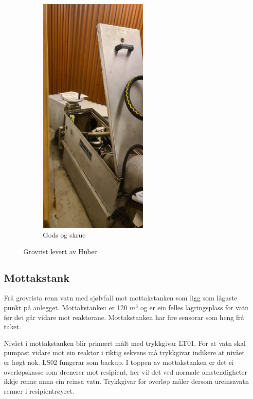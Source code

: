 \begin{figure}[htbp]
\begin{subfigure}[b]{0.3\textwidth}
        \includegraphics[angle=-90,width=0.6\textwidth]{Bilder/Huber2.JPG}
        \caption{Gods og skrue}\label{fig:Huber2}
    \end{subfigure}
    \caption{Grovrist levert av Huber}\label{fig:HuberGrovrist}
\end{figure}

\newpage
\subsection{Mottakstank}
Frå grovrista renn vatn med sjølvfall mot mottakstanken som ligg som lågaste punkt på anlegget.
Mottakstanken er 120 $m^3$ og er ein felles lagringsplass for vatn før det går vidare mot reaktorane.
Mottakstanken har fire sensorar som heng frå taket.

Nivået i mottakstanken blir primært målt med trykkgivar LT01. For at vatn skal pumpast vidare mot ein
reaktor i riktig sekvens må trykkgivar indikere at nivået er høgt nok. LS02 fungerar som backup. \newline
I toppen av mottakstanken er det ei overløpskasse som drenerer mot resipient, her vil det
ved normale omstendigheter ikkje renne anna ein reinsa vatn. Trykkgivar for overløp måler
dersom ureinsavatn renner i resipientrøyret.

